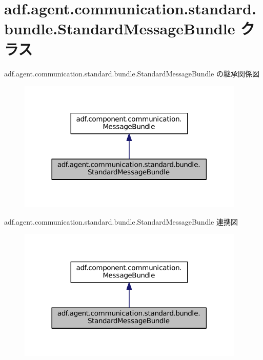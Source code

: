 \hypertarget{classadf_1_1agent_1_1communication_1_1standard_1_1bundle_1_1StandardMessageBundle}{}\section{adf.\+agent.\+communication.\+standard.\+bundle.\+Standard\+Message\+Bundle クラス}
\label{classadf_1_1agent_1_1communication_1_1standard_1_1bundle_1_1StandardMessageBundle}


adf.\+agent.\+communication.\+standard.\+bundle.\+Standard\+Message\+Bundle の継承関係図
\nopagebreak
\begin{figure}[H]
\begin{center}
\leavevmode
\includegraphics[width=306pt]{classadf_1_1agent_1_1communication_1_1standard_1_1bundle_1_1StandardMessageBundle__inherit__graph}
\end{center}
\end{figure}


adf.\+agent.\+communication.\+standard.\+bundle.\+Standard\+Message\+Bundle 連携図
\nopagebreak
\begin{figure}[H]
\begin{center}
\leavevmode
\includegraphics[width=306pt]{classadf_1_1agent_1_1communication_1_1standard_1_1bundle_1_1StandardMessageBundle__coll__graph}
\end{center}
\end{figure}
